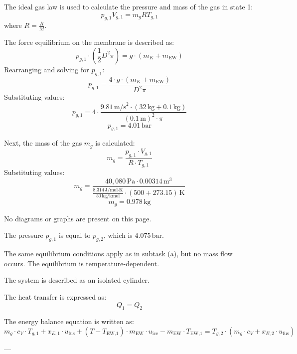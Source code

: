 The ideal gas law is used to calculate the pressure and mass of the gas in state 1:  
\[
p_{g,1} V_{g,1} = m_g R T_{g,1}
\]  
where \( R = \frac{\bar{R}}{M} \).  

The force equilibrium on the membrane is described as:  
\[
p_{g,1} \cdot \left( \frac{1}{2} D^2 \pi \right) = g \cdot (m_K + m_{\text{EW}})
\]  
Rearranging and solving for \( p_{g,1} \):  
\[
p_{g,1} = \frac{4 \cdot g \cdot (m_K + m_{\text{EW}})}{D^2 \pi}
\]  
Substituting values:  
\[
p_{g,1} = 4 \cdot \frac{9.81 \, \text{m/s}^2 \cdot (32 \, \text{kg} + 0.1 \, \text{kg})}{(0.1 \, \text{m})^2 \cdot \pi}
\]  
\[
p_{g,1} = 4.01 \, \text{bar}
\]  

Next, the mass of the gas \( m_g \) is calculated:  
\[
m_g = \frac{p_{g,1} \cdot V_{g,1}}{R \cdot T_{g,1}}
\]  
Substituting values:  
\[
m_g = \frac{40,080 \, \text{Pa} \cdot 0.00314 \, \text{m}^3}{\frac{8.314 \, \text{J/mol·K}}{50 \, \text{kg/kmol}} \cdot (500 + 273.15) \, \text{K}}
\]  
\[
m_g = 0.978 \, \text{kg}
\]  

No diagrams or graphs are present on this page.

The pressure \( p_{g,1} \) is equal to \( p_{g,2} \), which is \( 4.075 \, \text{bar} \).  

The same equilibrium conditions apply as in subtask (a), but no mass flow occurs. The equilibrium is temperature-dependent.  

The system is described as an isolated cylinder.  

The heat transfer is expressed as:  
\[
Q_1 = Q_2
\]  

The energy balance equation is written as:  
\[
m_g \cdot c_V \cdot T_{g,1} + x_{E,1} \cdot u_{\text{fus}} + (T - T_{\text{EW,1}}) \cdot m_{\text{EW}} \cdot u_{\text{ice}} - m_{\text{EW}} \cdot T_{\text{EW,1}} = T_{g,2} \cdot \left( m_g \cdot c_V + x_{E,2} \cdot u_{\text{fus}} \right)
\]  

---